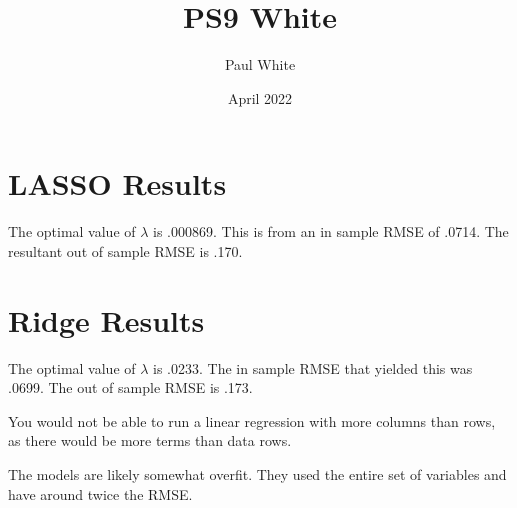 \documentclass{article}
\title{PS9 White}
\author{Paul White}
\date{April 2022}
\begin{document}
\maketitle

\section{LASSO Results}

The optimal value of $\lambda$ is .000869. This is from an in sample RMSE of .0714. The resultant out of sample RMSE is .170.

\section{Ridge Results}

The optimal value of $\lambda$ is .0233. The in sample RMSE that yielded this was .0699. The out of sample RMSE is .173.


You would not be able to run a linear regression with more columns than rows, as there would be more terms than data rows. 


The models are likely somewhat overfit. They used the entire set of variables and have around twice the RMSE.
\end{document}
